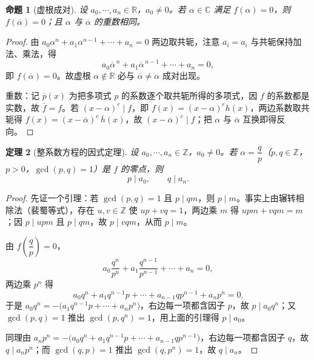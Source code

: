 \documentclass[UTF8,11pt]{ctexart}
\theoremstyle{cnthm}
\newtheorem{thm}{定理}[section]
\newtheorem{prop}[thm]{命题}
\begin{document}
\begin{prop}[虚根成对]
设 $a_0,\cdots,a_n\in\mathbb{R}$，$a_0\neq0$。若 $\alpha\in\mathbb{C}$ 满足 $f(\alpha)=0$，则 $f(\overline{\alpha})=0$；且 $\alpha$ 与 $\overline{\alpha}$ 的重数相同。
\end{prop}

\begin{proof}
由 $a_0\alpha^n+a_1\alpha^{n-1}+\cdots+a_n=0$ 两边取共轭，注意 $\overline{a_i}=a_i$ 与共轭保持加法、乘法，得
\[
a_0\overline{\alpha}^{\,n}+a_1\overline{\alpha}^{\,n-1}+\cdots+a_n=0,
\]
即 $f(\overline{\alpha})=0$。故虚根 $\alpha\notin\mathbb{R}$ 必与 $\overline{\alpha}\neq\alpha$ 成对出现。

重数：记 $\overline{p}(x)$ 为把多项式 $p$ 的系数逐个取共轭所得的多项式，因 $f$ 的系数都是实数，故 $\overline{f}=f$。若 $(x-\alpha)^{e}\mid f$，即 $f(x)=(x-\alpha)^e h(x)$，两边系数取共轭得 $f(x)=(x-\overline{\alpha})^{e}\,\overline{h}(x)$，故 $(x-\overline{\alpha})^{e}\mid f$；把 $\alpha$ 与 $\overline{\alpha}$ 互换即得反向。
\end{proof}

\begin{thm}[整系数方程的因式定理]
设 $a_0,\cdots,a_n\in\mathbb{Z}$，$a_0\neq0$。若 $\alpha=\dfrac{q}{p}$（$p,q\in\mathbb{Z}$，$p>0$，$\gcd(p,q)=1$）是 $f$ 的零点，则
\[
p\mid a_0,\qquad q\mid a_n.
\]
\end{thm}

\begin{proof}
先证一个引理：若 $\gcd(p,q)=1$ 且 $p\mid qm$，则 $p\mid m$。事实上由辗转相除法（裴蜀等式），存在 $u,v\in\mathbb{Z}$ 使 $up+vq=1$，两边乘 $m$ 得 $upm+vqm=m$；因 $p\mid upm$ 且 $p\mid qm$，故 $p\mid vqm$，从而 $p\mid m$。

由 $f\!\left(\dfrac{q}{p}\right)=0$，
\[
a_0\frac{q^n}{p^n}+a_1\frac{q^{n-1}}{p^{n-1}}+\cdots+a_n=0,
\]
两边乘 $p^n$ 得
\[
a_0q^n+a_1q^{n-1}p+\cdots+a_{n-1}qp^{n-1}+a_np^n=0.
\]
于是 $a_0q^n=-\bigl(a_1q^{n-1}p+\cdots+a_np^n\bigr)$，右边每一项都含因子 $p$，故 $p\mid a_0q^n$；又 $\gcd(p,q)=1$ 推出 $\gcd(p,q^n)=1$，用上面的引理得 $p\mid a_0$。

同理由 $a_np^n=-\bigl(a_0q^n+a_1q^{n-1}p+\cdots+a_{n-1}qp^{n-1}\bigr)$，右边每一项都含因子 $q$，故 $q\mid a_np^n$；而 $\gcd(q,p)=1$ 推出 $\gcd(q,p^n)=1$，故 $q\mid a_n$。
\end{proof}
\end{document}
